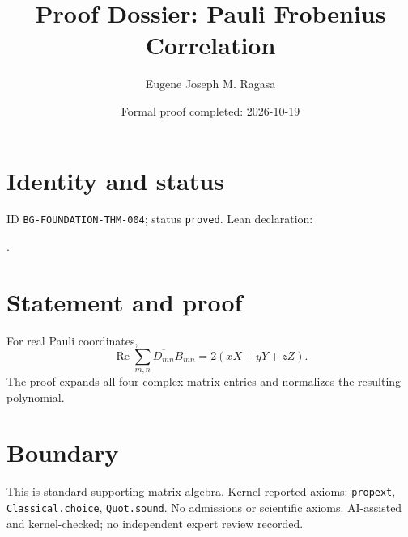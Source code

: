\documentclass[11pt]{article}
\title{Proof Dossier: Pauli Frobenius Correlation}\author{Eugene Joseph M. Ragasa}\date{Formal proof completed: 2026-10-19}
\begin{document}
\maketitle
\section{Identity and status}
ID \texttt{BG-FOUNDATION-THM-004}; status \texttt{proved}. Lean declaration:
\par{}.
\section{Statement and proof}
For real Pauli coordinates,
\[\operatorname{Re}\sum_{m,n}\overline{D_{mn}}B_{mn}
  =2(xX+yY+zZ).\]
The proof expands all four complex matrix entries and normalizes the resulting polynomial.
\section{Boundary}
This is standard supporting matrix algebra. Kernel-reported axioms: \texttt{propext},
\texttt{Classical.choice}, \texttt{Quot.sound}. No admissions or scientific axioms.
AI-assisted and kernel-checked; no independent expert review recorded.
\end{document}
